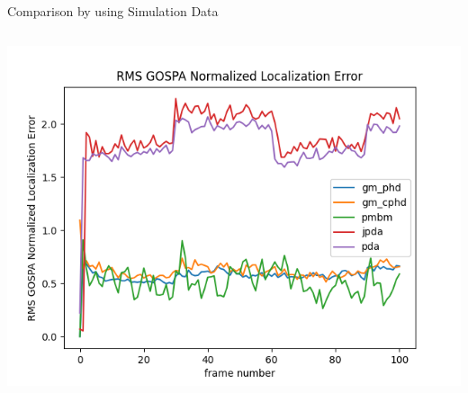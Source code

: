 \documentclass[12pt]{beamer}
\begin{document}
\begin{frame}{Comparison by using Simulation Data}
\begin{columns}[t]
\begin{column}{0.5\linewidth}
      \includegraphics[width=\linewidth,height=\textheight,keepaspectratio]{real_data/scenario3/gospa_localization.png}\\
  \end{column}
\end{columns}
\end{frame}
\end{document}
